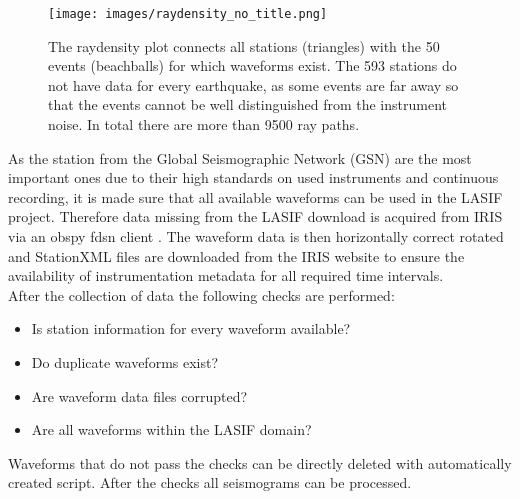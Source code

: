 \begin{figure}[H]
\begin{center}
\texttt{[image: images/raydensity\_no\_title.png]}
\caption[The raydensity plot for the 50 events.]{The raydensity plot connects all stations (triangles) with the 50 
events (beachballs) for which waveforms exist. 
The 593 stations do not have data for every earthquake, as some events are far away so that the events cannot be well
distinguished from the instrument noise. In total there are more than 9500 ray paths.}
\label{raydens}
\end{center}
\end{figure}

As the station from the Global Seismographic Network (GSN) are the most important ones due to their high standards on used 
instruments and continuous recording, it is made sure that all available waveforms can be used in the LASIF project. 
Therefore data missing from the LASIF download is acquired from IRIS via an obspy fdsn client \citep{Krischer2015}. 
The waveform data is then horizontally correct rotated and StationXML files are downloaded from the IRIS website to
ensure the availability of instrumentation metadata for all required time intervals. \\


After the collection of data the following checks are performed:
\begin{itemize}
\item Is station information for every waveform available?
\item Do duplicate waveforms exist?
\item Are waveform data files corrupted?
\item Are all waveforms within the LASIF domain?
\end{itemize}

Waveforms that do not pass the checks can be directly deleted with automatically created script.
After the checks all seismograms can be processed. 



